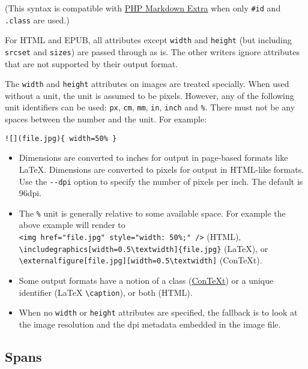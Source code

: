 \documentclass[]{article}
\providecommand{\tightlist}{%
  \setlength{\itemsep}{0pt}\setlength{\parskip}{0pt}}
\begin{document}
(This syntax is compatible with
\href{https://michelf.ca/projects/php-markdown/extra/}{PHP Markdown
Extra} when only \texttt{\#id} and \texttt{.class} are used.)

For HTML and EPUB, all attributes except \texttt{width} and
\texttt{height} (but including \texttt{srcset} and \texttt{sizes}) are
passed through as is. The other writers ignore attributes that are not
supported by their output format.

The \texttt{width} and \texttt{height} attributes on images are treated
specially. When used without a unit, the unit is assumed to be pixels.
However, any of the following unit identifiers can be used: \texttt{px},
\texttt{cm}, \texttt{mm}, \texttt{in}, \texttt{inch} and \texttt{\%}.
There must not be any spaces between the number and the unit. For
example:

\begin{verbatim}
![](file.jpg){ width=50% }
\end{verbatim}

\begin{itemize}
\tightlist
\item
  Dimensions are converted to inches for output in page-based formats
  like LaTeX. Dimensions are converted to pixels for output in HTML-like
  formats. Use the \texttt{-\/-dpi} option to specify the number of
  pixels per inch. The default is 96dpi.
\item
  The \texttt{\%} unit is generally relative to some available space.
  For example the above example will render to
  \texttt{\textless{}img\ href="file.jpg"\ style="width:\ 50\%;"\ /\textgreater{}}
  (HTML),
  \texttt{\textbackslash{}includegraphics{[}width=0.5\textbackslash{}textwidth{]}\{file.jpg\}}
  (LaTeX), or
  \texttt{\textbackslash{}externalfigure{[}file.jpg{]}{[}width=0.5\textbackslash{}textwidth{]}}
  (ConTeXt).
\item
  Some output formats have a notion of a class
  (\href{http://wiki.contextgarden.net/Using_Graphics\#Multiple_Image_Settings}{ConTeXt})
  or a unique identifier (LaTeX \texttt{\textbackslash{}caption}), or
  both (HTML).
\item
  When no \texttt{width} or \texttt{height} attributes are specified,
  the fallback is to look at the image resolution and the dpi metadata
  embedded in the image file.
\end{itemize}

\subsection{Spans}\label{spans}
\end{document}
